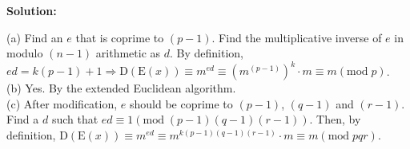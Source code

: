 \documentclass[12pt]{article}
\newenvironment{solution}{\par\noindent\textbf{Solution:}\par}{\par\vspace{1em}}
\begin{document}
\begin{solution}
    \noindent
    (a) Find an $e$ that is coprime to $(p-1)$. Find the multiplicative inverse of $e$ in modulo $(n-1)$ arithmetic as $d$.
    By definition, $ed=k\left( p-1 \right) +1\Longrightarrow \mathrm{D}\left( \mathrm{E}\left( x \right) \right) \equiv m^{ed}\equiv \left( m^{\left( p-1 \right)} \right) ^k\cdot m\equiv m\left( \mathrm{mod}\;p \right) $.\\
    (b) Yes. By the extended Euclidean algorithm.\\
    (c) After modification, $e$ should be coprime to $(p-1)$, $(q-1)$ and $(r-1)$.
    Find a $d$ such that $ed\equiv 1\left( \mathrm{mod}\;\left( p-1 \right) \left( q-1 \right) \left( r-1 \right) \right) $.
    Then, by definition, $\mathrm{D}\left( \mathrm{E}\left( x \right) \right) \equiv m^{ed}\equiv m^{k\left( p-1 \right) \left( q-1 \right) \left( r-1 \right)}\cdot m\equiv m\left( \mathrm{mod}\;pqr \right) $.
\end{solution}
\end{document}
